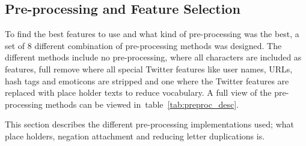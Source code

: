 \subsection{Pre-processing and Feature Selection}

To find the best features to use and what kind of pre-processing was the best, a set of 8 different combination of pre-processing methods was designed. The different methods include no pre-processing, where all characters are included as features, full remove where all special Twitter features like user names, URLs, hash tags and emoticons are stripped and one where the Twitter features are replaced with place holder texts to reduce vocabulary. A full view of the pre-processing methods can be viewed in~table~\ref{tab:preproc_desc}.

This section describes the different pre-processing implementations used; what place holders, negation attachment and reducing letter duplications is.

